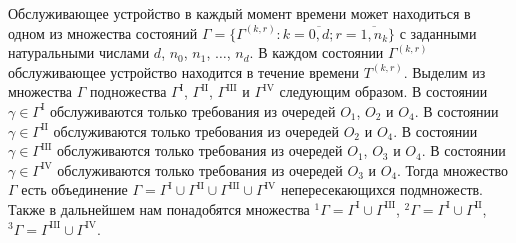 Обслуживающее устройство в каждый момент времени может находиться в одном из множества состояний $\Gamma=\{\Gamma^{(k, r)} \colon k=\overline{0, d}; r=\overline{1, n_k}\}$ с заданными натуральными числами $d$,  $n_0$,  $n_1$,  $\ldots$,  $n_d$. В каждом состоянии $\Gamma^{(k, r)}$ обслуживающее устройство находится в течение времени $T^{(k, r)}$. Выделим из множества $\Gamma$ подножества $\Gamma^{\mathrm{I}}$,  $\Gamma^{\mathrm{II}}$, 
$\Gamma^{\mathrm{III}}$ и $\Gamma^{\mathrm{IV}}$ следующим образом. В состоянии $\gamma \in \Gamma^{\mathrm{I}}$ обслуживаются только требования из очередей $O_1$,  $O_2$ и $O_4$.
В состоянии $\gamma \in \Gamma^{\mathrm{II}}$ обслуживаются только требования из очередей $O_2$ и $O_4$.
В состоянии $\gamma \in \Gamma^{\mathrm{III}}$ обслуживаются только требования из очередей $O_1$,  $O_3$ и $O_4$.
В состоянии $\gamma \in \Gamma^{\mathrm{IV}}$ обслуживаются только требования из очередей $O_3$ и $O_4$.
Тогда множество $\Gamma$ есть объединение $\Gamma = \Gamma^{\mathrm{I}} \cup \Gamma^{\mathrm{II}} \cup \Gamma^{\mathrm{III}} \cup\Gamma^{\mathrm{IV}}$ непересекающихся подмножеств. Также в дальнейшем нам понадобятся множества ${}^1\Gamma=\Gamma^{\mathrm{I}} \cup \Gamma^{\mathrm{III}}$,  
${}^2\Gamma=\Gamma^{\mathrm{I}} \cup \Gamma^{\mathrm{II}}$, 
${}^3\Gamma=\Gamma^{\mathrm{III}} \cup \Gamma^{\mathrm{IV}}$. 

